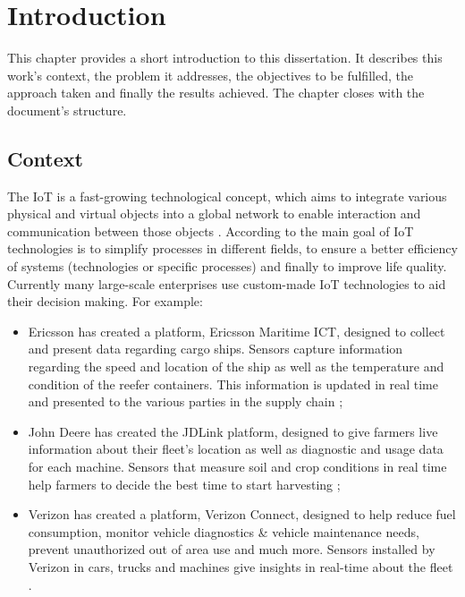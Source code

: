 \chapter{Introduction}
\label{chap:introduction}

This chapter provides a short introduction to this dissertation. It describes this work's context, the problem it addresses, the objectives to be fulfilled, the approach taken and finally the results achieved. The chapter closes with the document's structure.

\section{Context}
\label{sec:introduction:context}

The \gls{IoT} is a fast-growing technological concept, which aims to integrate various physical and virtual objects into a global network to enable interaction and communication between those objects \parencite{Atzori2010TheIO}. According to \cite{NIZETIC2020122877} the main goal of \gls{IoT} technologies is to simplify processes in different fields, to ensure a better efficiency of systems (technologies or specific processes) and finally to improve life quality.
Currently many large-scale enterprises use custom-made \gls{IoT} technologies to aid their decision making. For example:

\begin{itemize}
    \item Ericsson has created a platform, Ericsson Maritime ICT, designed to collect and present data regarding cargo ships. Sensors capture information regarding the speed and location of the ship as well as the temperature and condition of the reefer containers. This information is updated in real time and presented to the various parties in the supply chain \parencite{ericson-marinetime};
    \item John Deere has created the JDLink platform, designed to give farmers live information about their fleet's location as well as diagnostic and usage data for each machine. Sensors that measure soil and crop conditions in real time help farmers to decide the best time to start harvesting \parencite{jdlink};
    \item Verizon has created a platform, Verizon Connect, designed to help reduce fuel consumption, monitor vehicle diagnostics \& vehicle maintenance needs, prevent unauthorized out of area use and much more. Sensors installed by Verizon in cars, trucks and machines give insights in real-time about the fleet \parencite{verizon-iot}.
\end{itemize}

